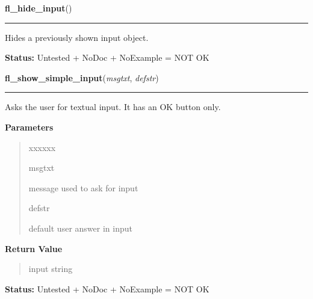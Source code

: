     \vspace{0.5ex}

\hspace{.8\funcindent}\begin{boxedminipage}{\funcwidth}

    \raggedright \textbf{fl\_hide\_input}()

    \vspace{-1.5ex}

    \rule{\textwidth}{0.5\fboxrule}
\setlength{\parskip}{2ex}
    Hides a previously shown input object.

\setlength{\parskip}{1ex}
\textbf{Status:} Untested + NoDoc + NoExample = NOT OK



    \end{boxedminipage}

    \label{xformslib:library:fl_show_simple_input}

    \vspace{0.5ex}

\hspace{.8\funcindent}\begin{boxedminipage}{\funcwidth}

    \raggedright \textbf{fl\_show\_simple\_input}(\textit{msgtxt}, \textit{defstr})

    \vspace{-1.5ex}

    \rule{\textwidth}{0.5\fboxrule}
\setlength{\parskip}{2ex}
    Asks the user for textual input. It has an OK button only.

\setlength{\parskip}{1ex}
      \textbf{Parameters}
      \vspace{-1ex}

      \begin{quote}
        \begin{Ventry}{xxxxxx}

          \item[msgtxt]

          message used to ask for input

          \item[defstr]

          default user answer in input

        \end{Ventry}

      \end{quote}

      \textbf{Return Value}
    \vspace{-1ex}

      \begin{quote}
      input string

      \end{quote}

\textbf{Status:} Untested + NoDoc + NoExample = NOT OK



    \end{boxedminipage}

